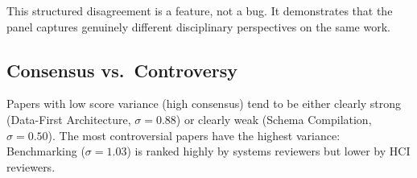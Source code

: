 This structured disagreement is a feature, not a bug. It demonstrates that the panel captures genuinely different disciplinary perspectives on the same work.

\subsection{Consensus vs.\ Controversy}

Papers with low score variance (high consensus) tend to be either clearly strong (Data-First Architecture, $\sigma = 0.88$) or clearly weak (Schema Compilation, $\sigma = 0.50$). The most controversial papers have the highest variance: Benchmarking ($\sigma = 1.03$) is ranked highly by systems reviewers but lower by HCI reviewers.
